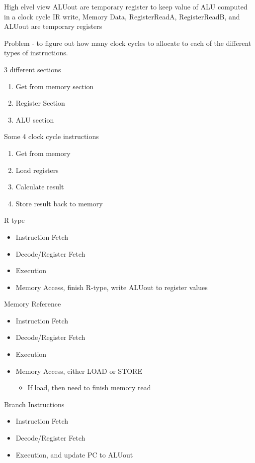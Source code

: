 \documentclass{article}
\begin{document}
	High elvel view
		ALUout are temporary register to keep value of ALU computed in a clock cycle
		IR write, Memory Data, RegisterReadA, RegisterReadB, and ALUout are temporary registers
		
		Problem - to figure out how many clock cycles to allocate to each of the different types of instructions.

		3 different sections 
		\begin{enumerate}
			\item Get from memory section
			\item Register Section
			\item ALU section
		\end{enumerate}

		Some 4 clock cycle instructions
		\begin{enumerate}
			\item Get from memory
			\item Load registers
			\item Calculate result
			\item Store result back to memory
		\end{enumerate}

		R type
		\begin{itemize}
			\item Instruction Fetch
			\item Decode/Register Fetch
			\item Execution
			\item Memory Access, finish R-type, write ALUout to register values
		\end{itemize}

		Memory Reference
		\begin{itemize}
			\item Instruction Fetch
			\item Decode/Register Fetch
			\item Execution
			\item Memory Access, either LOAD or STORE
			\begin{itemize}
				\item If load, then need to finish memory read
			\end{itemize}
		\end{itemize}

		Branch Instructions
		\begin{itemize}
			\item Instruction Fetch
			\item Decode/Register Fetch
			\item Execution, and update PC to ALUout
		\end{itemize}
\end{document}

